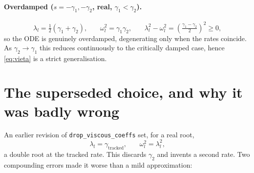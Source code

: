 \documentclass[11pt]{article}
\begin{document}
\paragraph{Overdamped ($s=-\gamma_1,-\gamma_2$, real, $\gamma_1<\gamma_2$).}
\begin{equation}
  \lambda_l = \tfrac{1}{2}(\gamma_1+\gamma_2)\text{,}\qquad
  \omega_l^2 = \gamma_1\gamma_2\text{,}\qquad
  \lambda_l^2-\omega_l^2 = \left(\tfrac{\gamma_1-\gamma_2}{2}\right)^2 \ge 0\text{,}
  \label{eq:case-b}
\end{equation}
so the ODE is genuinely overdamped, degenerating only when the rates coincide. As
$\gamma_2\to\gamma_1$ this reduces continuously to the critically damped case, hence
\eqref{eq:vieta} is a strict generalisation.

\section{The superseded choice, and why it was badly wrong}

An earlier revision of \texttt{drop\_viscous\_coeffs} set, for a real root,
\begin{equation}
  \lambda_l = \gamma_{\text{tracked}}\text{,}\qquad \omega_l^2 = \lambda_l^2\text{,}
  \label{eq:superseded}
\end{equation}
a double root at the tracked rate. This discards $\gamma_2$ and invents a second rate. Two
compounding errors made it worse than a mild approximation:
\end{document}

